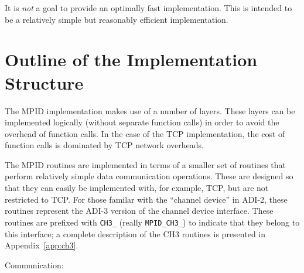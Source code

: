 \documentclass{article}
\def\code{\begingroup\makeustext\eatcode}
\def\eatcode#1{\texttt{#1}\endgroup}
\begin{document}
It is \emph{not} a goal to provide an optimally fast implementation. This is
intended to be a relatively simple but reasonably efficient implementation.

\section{Outline of the Implementation Structure}
\label{sec:impl-outline}

The MPID implementation makes use of a number of layers.  These layers
can be implemented logically (without separate function calls) in
order to avoid the overhead of function calls.  In the case of the TCP
implementation, the cost of function calls is dominated by TCP network
overheads.  


The MPID routines are implemented in terms of a smaller set of routines that
perform relatively simple data communication operations.  These are designed
so that they can easily be implemented with, for example, TCP, but are not
restricted to TCP.  For those familar with the ``channel device'' in ADI-2,
these routines represent the ADI-3 version of the channel device interface.
These routines are prefixed with \code{CH3_} (really \code{MPID_CH3_}) to
indicate that they belong to 
this interface; a complete description of the CH3 routines is presented in
Appendix~\ref{app:ch3}. 

Communication:
\end{document}

